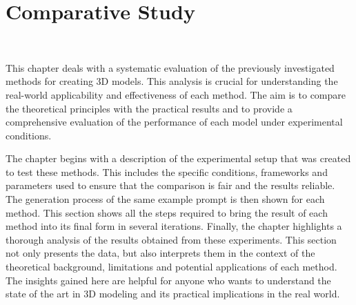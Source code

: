 \chapter{Comparative Study}~\label{ch:comparative study}

This chapter deals with a systematic evaluation of the previously investigated methods for creating 3D models. This analysis is crucial for understanding the real-world applicability and effectiveness of each method. The aim is to compare the theoretical principles with the practical results and to provide a comprehensive evaluation of the performance of each model under experimental conditions.

The chapter begins with a description of the experimental setup that was created to test these methods. This includes the specific conditions, frameworks and parameters used to ensure that the comparison is fair and the results reliable. 
The generation process of the same example prompt is then shown for each method. This section shows all the steps required to bring the result of each method into its final form in several iterations. Finally, the chapter highlights a thorough analysis of the results obtained from these experiments. This section not only presents the data, but also interprets them in the context of the theoretical background, limitations and potential applications of each method. The insights gained here are helpful for anyone who wants to understand the state of the art in 3D modeling and its practical implications in the real world.



